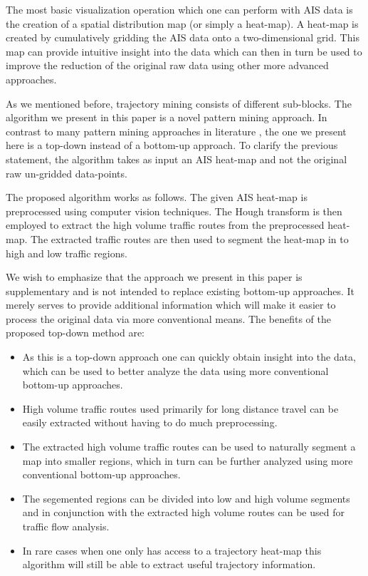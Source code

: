 \documentclass{article}
\begin{document}
The most basic visualization operation which one can perform with AIS data is the creation of a spatial distribution map (or simply a heat-map). A heat-map 
is created by cumulatively gridding the AIS data onto a two-dimensional grid. This map can provide 
intuitive insight into the data which can then in turn be used to improve the reduction of the original raw data using other more advanced approaches.

As we mentioned before, trajectory mining consists of different sub-blocks. The algorithm we present in this paper is a novel pattern mining approach. In contrast to many 
pattern mining approaches in literature \cite{zheng2015}, the one we present here is a top-down instead of a bottom-up approach. To clarify the previous statement, the algorithm 
takes as input an AIS heat-map and not the original raw un-gridded data-points.

The proposed algorithm works as follows. The given AIS heat-map is preprocessed using computer vision techniques. The Hough transform is then employed to extract the high volume traffic routes from the preprocessed heat-map. The extracted traffic routes are then used to segment the 
heat-map in to high and low traffic regions.

We wish to emphasize that the approach we present in this paper is supplementary and is not intended to replace existing bottom-up approaches. It merely serves to provide additional information 
which will make it easier to process the original data via more conventional means.
The benefits of the proposed top-down method are:
\begin{itemize}
 \item As this is a top-down approach one can quickly obtain insight into the data, which can be used to better analyze the data using more conventional bottom-up approaches.
 \item High volume traffic routes used primarily for long distance travel can be easily extracted without having to do much preprocessing. 
 \item The extracted high volume traffic routes can be used to naturally segment a map into smaller regions, which in turn can be further analyzed using more conventional bottom-up approaches.
 \item The segemented regions can be divided into low and high volume segments and in conjunction with the extracted high volume routes can be used for traffic flow analysis.
 \item In rare cases when one only has access to a trajectory heat-map this algorithm will still be able to extract useful trajectory information.
 \end{itemize}
 
\end{document}
